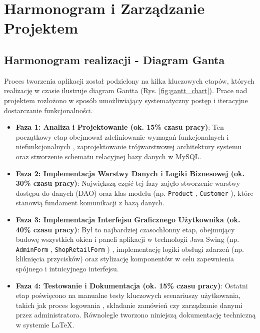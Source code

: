
\chapter{Harmonogram i Zarządzanie Projektem}
\label{chap:harmonogram}

\section{Harmonogram realizacji - Diagram Ganta}
\label{sec:gantt}

Proces tworzenia aplikacji został podzielony na kilka kluczowych etapów, których realizację w czasie ilustruje diagram Gantta (Rys. \ref{fig:gantt_chart}). Prace nad projektem rozłożono w sposób umożliwiający systematyczny postęp i iteracyjne dostarczanie funkcjonalności.

\begin{itemize}
    \item \textbf{Faza 1: Analiza i Projektowanie (ok. 15\% czasu pracy)}: Ten początkowy etap obejmował zdefiniowanie wymagań funkcjonalnych i niefunkcjonalnych , zaprojektowanie trójwarstwowej architektury systemu  oraz stworzenie schematu relacyjnej bazy danych w MySQL.
    
    \item \textbf{Faza 2: Implementacja Warstwy Danych i Logiki Biznesowej (ok. 30\% czasu pracy)}: Największą część tej fazy zajęło stworzenie warstwy dostępu do danych (DAO)  oraz klas modelu (np. \texttt{Product} , \texttt{Customer} ), które stanowią fundament komunikacji z bazą danych.
    
    \item \textbf{Faza 3: Implementacja Interfejsu Graficznego Użytkownika (ok. 40\% czasu pracy)}: Był to najbardziej czasochłonny etap, obejmujący budowę wszystkich okien i paneli aplikacji w technologii Java Swing (np. \texttt{AdminForm} , \texttt{ShopRetailForm} ) , implementację logiki obsługi zdarzeń (np. kliknięcia przycisków)  oraz stylizację komponentów w celu zapewnienia spójnego i intuicyjnego interfejsu.
    
    \item \textbf{Faza 4: Testowanie i Dokumentacja (ok. 15\% czasu pracy)}: Ostatni etap poświęcono na manualne testy kluczowych scenariuszy użytkowania, takich jak proces logowania , składanie zamówień  czy zarządzanie danymi przez administratora. Równolegle tworzono niniejszą dokumentację techniczną w systemie \LaTeX.
\end{itemize}

